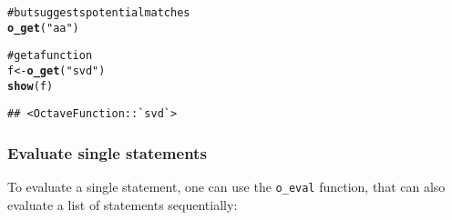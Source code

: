\documentclass[english,10pt,a4paper]{article}\usepackage{graphicx, color}
\makeatletter
\newcommand{\hlfunctioncall}[1]{\textcolor[rgb]{0.501960784313725,0,0.329411764705882}{\textbf{#1}}}%
\newcommand{\hlstring}[1]{\textcolor[rgb]{0.6,0.6,1}{#1}}%
\newcommand{\hlcomment}[1]{\textcolor[rgb]{0.180392156862745,0.6,0.341176470588235}{#1}}%
\newenvironment{kframe}{%
 \def\at@end@of@kframe{}%
 \ifinner\ifhmode%
  \def\at@end@of@kframe{\end{minipage}}%
  \begin{minipage}{\columnwidth}%
 \fi\fi%
 \def\FrameCommand##1{\hskip\@totalleftmargin \hskip-\fboxsep
 \colorbox{shadecolor}{##1}\hskip-\fboxsep
     \hskip-\linewidth \hskip-\@totalleftmargin \hskip\columnwidth}%
 \MakeFramed {\advance\hsize-\width
   \@totalleftmargin\z@ \linewidth\hsize
   \@setminipage}}%
 {\par\unskip\endMakeFramed%
 \at@end@of@kframe}
\newenvironment{knitrout}{}{} %
\let\code=\texttt
\makeatother
\begin{document}
\begin{knitrout}
\begin{kframe}
{\ttfamily\noindent\bfseries\color{errorcolor}{\#\# Error: RcppOctave::o\_get - Could not find an Octave object named 'xxxxx'.}}\begin{alltt}
\hlcomment{# but suggests potential matches}
\hlfunctioncall{o_get}(\hlstring{"aa"})
\end{alltt}


{\ttfamily\noindent\bfseries\color{errorcolor}{\#\# Error: RcppOctave::o\_get - Could not find an Octave object named 'aa'.\\\#\#\ \ \ \ \ \ \ \ Match(es): aaa aab}}\begin{alltt}
\hlcomment{# get a function}
f <- \hlfunctioncall{o_get}(\hlstring{"svd"})
\hlfunctioncall{show}(f)
\end{alltt}
\begin{verbatim}
## <OctaveFunction::`svd`>
\end{verbatim}
\end{kframe}
\end{knitrout}


\subsubsection{Evaluate single statements}

To evaluate a single statement, one can use the \code{o\_eval} function, that
can also evaluate a list of statements sequentially:
\end{document}
